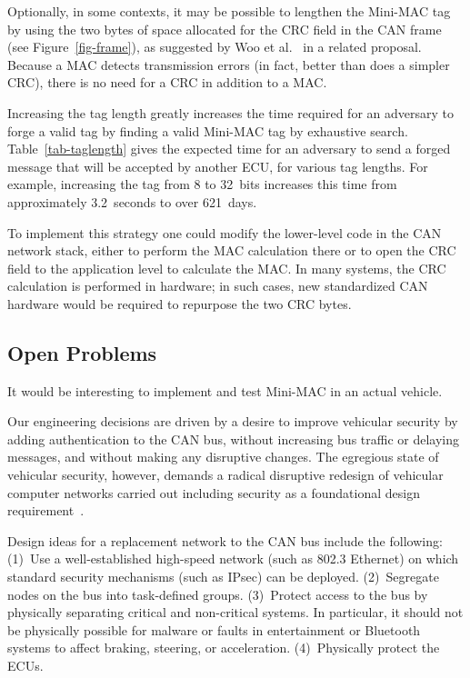 Optionally, in some contexts, it may be 
possible to lengthen the Mini-MAC tag by 
using the two bytes of space allocated for the CRC field in the CAN frame (see Figure~\ref{fig-frame}),
as suggested by Woo et al.~\cite{Woo-14} in a related proposal.
Because a MAC detects transmission errors (in fact, better than does a simpler CRC), there is no need for
a CRC in addition to a MAC.  

Increasing the tag length greatly increases the time required for an adversary to forge a valid tag by
finding a valid Mini-MAC tag by exhaustive search.  
Table~\ref{tab-taglength} gives the expected time for an adversary to send a forged message 
that will be accepted by another ECU, for various tag lengths.  
For example, increasing the tag from 8 to 32~bits increases this time from
approximately 3.2~seconds to over 621~days.


To implement this strategy one could modify the lower-level code in the CAN network stack, 
either to perform the MAC calculation there 
or to open the CRC field to the application level to calculate the MAC. 
In many systems, the CRC calculation is performed in hardware;
in such cases, new standardized CAN hardware would be required to repurpose the two CRC bytes.

\subsection{Open Problems}
\label{open}

It would be interesting to implement and test Mini-MAC in an actual vehicle.

Our engineering decisions are driven by a desire to improve vehicular security by adding authentication
to the CAN bus, without increasing bus traffic or delaying messages, and without making any
disruptive changes.  The egregious state of vehicular security, however, demands a radical disruptive
redesign of vehicular computer networks carried out including security as a foundational design
requirement~\cite{Wolf2006}. 

Design ideas for a replacement network to the CAN bus include the following:  
(1)~Use a well-established high-speed network (such as 802.3 Ethernet) on which
standard security mechanisms (such as IPsec) can be deployed.
(2)~Segregate nodes on the bus into task-defined groups.
(3)~Protect access to the bus by physically separating critical and non-critical systems.
In particular, it should not be physically possible for malware or faults in entertainment or 
Bluetooth systems to affect braking, steering, or acceleration. 
(4)~Physically protect the ECUs. 

